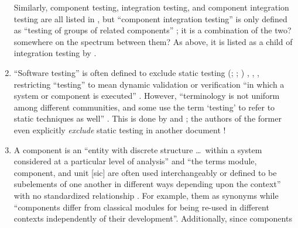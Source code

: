 \begin{enumerate}
          Similarly, component testing, integration testing, and component
          integration testing are all listed in \citep{IEEE2017}, but ``component
          integration testing'' is only defined as ``testing of groups of
          related components'' \citep[p.~82]{IEEE2017}; it is a combination of
          the two? somewhere on the spectrum between them? As above, it is
          listed as a child of integration testing by \citetISTQB{}.
    \item %
          ``Software testing'' is often defined to exclude static testing
          \ifnotpaper
              (\citealp[p.~13]{Firesmith2015}; \citealp[p.~222]{AmmannAndOffutt2017};
              \citealp[p.~439]{PetersAndPedrycz2000})%
          \else
              \cite[p.~439]{PetersAndPedrycz2000}, \cite[p.~13]{Firesmith2015},
              \cite[p.~222]{AmmannAndOffutt2017}%
          \fi, restricting ``testing'' to mean dynamic validation
          \citep[p.~5\=/1]{SWEBOK2024} or verification ``in which a system or
          component is executed'' \citep[p.~427]{IEEE2017}. However,
          ``terminology is not uniform among different communities, and some
          use the term `testing' to refer to static techniques%
           as well'' \citep[p.~5\=/2]{SWEBOK2024}.
          This is done by \citet[p.~17]{IEEE2022} and
          \citet[pp.~8--9]{Gerrard2000a}; the \ifnotpaper \else authors of the
          \fi former even explicitly \emph{exclude} static testing in another
          document \citeyearpar[p.~440]{IEEE2017}!
    \item %
          A component is an ``entity with discrete structure \dots\ within a
          system considered at a particular level of analysis''
          \citep{ISO_IEC2023b} and ``the terms module, component, and unit
              [sic] are often used interchangeably or defined to be subelements
          of one another in different ways depending upon the context'' with
          no standardized relationship \citep[p.~82]{IEEE2017}. For example,
          \citetISTQB{}  them as synonyms while
          \citet[p.~107]{BaresiAndPezzè2006}  ``components
          differ from classical modules for being re-used in different contexts
          independently of their development''. Additionally, since components

\end{enumerate}
